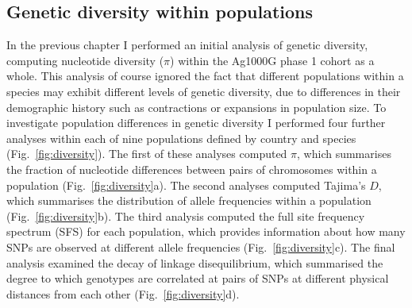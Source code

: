 \begin{refsection}
\subsection{Genetic diversity within populations}\label{subsec:diversity}


In the previous chapter I performed an initial analysis of genetic diversity, computing nucleotide diversity ($\pi$) within the Ag1000G phase 1 cohort as a whole.
%
This analysis of course ignored the fact that different populations within a species may exhibit different levels of genetic diversity, due to differences in their demographic history such as contractions or expansions in population size.
%
To investigate population differences in genetic diversity I performed four further analyses within each of nine populations defined by country and species (Fig.~\ref{fig:diversity}).
%
The first of these analyses computed $\pi$, which summarises the fraction of nucleotide differences between pairs of chromosomes within a population (Fig.~\ref{fig:diversity}a).
%
The second analyses computed Tajima's $D$, which summarises the distribution of allele frequencies within a population (Fig.~\ref{fig:diversity}b).
%
The third analysis computed the full site frequency spectrum (SFS) for each population, which provides information about how many SNPs are observed at different allele frequencies (Fig.~\ref{fig:diversity}c).
%
The final analysis examined the decay of linkage disequilibrium, which summarised the degree to which genotypes are correlated at pairs of SNPs at different physical distances from each other (Fig.~\ref{fig:diversity}d).



\end{refsection}
